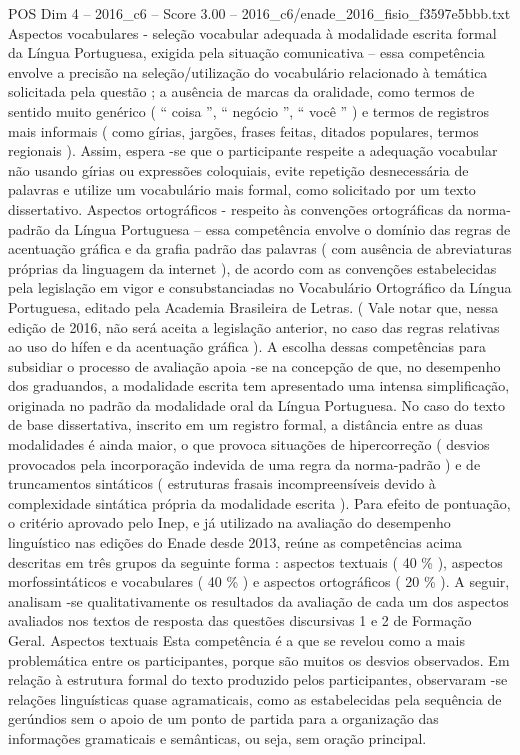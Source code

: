\begin{textsample}{POS Dim 4 – 2016\_c6 – Score 3.00 – 2016\_c6/enade\_2016\_fisio\_f3597e5bbb.txt}
Aspectos vocabulares - seleção vocabular adequada à modalidade escrita formal da Língua Portuguesa, exigida pela situação comunicativa – essa competência envolve a precisão na seleção/utilização do vocabulário relacionado à temática solicitada pela questão ; a ausência de marcas da oralidade, como termos de sentido muito genérico ( “ coisa ”, “ negócio ”, “ você ” ) e termos de registros mais informais ( como gírias, jargões, frases feitas, ditados populares, termos regionais ).
Assim, espera -se que o participante respeite a adequação vocabular não usando gírias ou expressões coloquiais, evite repetição desnecessária de palavras e utilize um vocabulário mais formal, como solicitado por um texto dissertativo.
Aspectos ortográficos - respeito às convenções ortográficas da norma-padrão da Língua Portuguesa – essa competência envolve o domínio das regras de acentuação gráfica e da grafia padrão das palavras ( com ausência de abreviaturas próprias da linguagem da internet ), de acordo com as convenções estabelecidas pela legislação em vigor e consubstanciadas no Vocabulário Ortográfico da Língua Portuguesa, editado pela Academia Brasileira de Letras. ( Vale notar que, nessa edição de 2016, não será aceita a legislação anterior, no caso das regras relativas ao uso do hífen e da acentuação gráfica ).
A escolha dessas competências para subsidiar o processo de avaliação apoia -se na concepção de que, no desempenho dos graduandos, a modalidade escrita tem apresentado uma intensa simplificação, originada no padrão da modalidade oral da Língua Portuguesa.
No caso do texto de base dissertativa, inscrito em um registro formal, a distância entre as duas modalidades é ainda maior, o que provoca situações de hipercorreção ( desvios provocados pela incorporação indevida de uma regra da norma-padrão ) e de truncamentos sintáticos ( estruturas frasais incompreensíveis devido à complexidade sintática própria da modalidade escrita ).
Para efeito de pontuação, o critério aprovado pelo Inep, e já utilizado na avaliação do desempenho linguístico nas edições do Enade desde 2013, reúne as competências acima descritas em três grupos da seguinte forma : aspectos textuais ( 40 \% ), aspectos morfossintáticos e vocabulares ( 40 \% ) e aspectos ortográficos ( 20 \% ).
A seguir, analisam -se qualitativamente os resultados da avaliação de cada um dos aspectos avaliados nos textos de resposta das questões discursivas 1 e 2 de Formação Geral.
Aspectos textuais Esta competência é a que se revelou como a mais problemática entre os participantes, porque são muitos os desvios observados.
Em relação à estrutura formal do texto produzido pelos participantes, observaram -se relações linguísticas quase agramaticais, como as estabelecidas pela sequência de gerúndios sem o apoio de um ponto de partida para a organização das informações gramaticais e semânticas, ou seja, sem oração principal.

\end{textsample}
